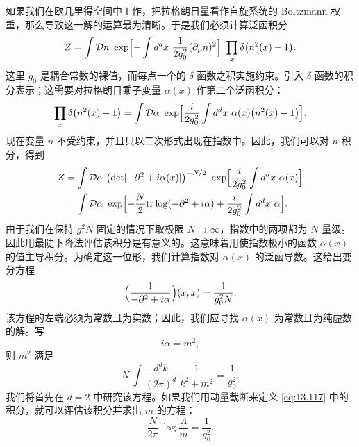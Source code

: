 如果我们在欧几里得空间中工作，把拉格朗日量看作自旋系统的 Boltzmann 权重，那么导致这一解的运算最为清晰。于是我们必须计算泛函积分
\begin{equation}
  Z = \int \mathcal{D}n\ \exp\Bigl[ -\int d^dx\ \frac{1}{2g_0^2}
    (\partial_\mu n)^2 \Bigr]\ \prod_x \delta\bigl( n^2(x) - 1 \bigr) .
  \label{eq:13.112}
\end{equation}
这里 $g_0$ 是耦合常数的裸值，而每点一个的 $\delta$ 函数之积实施约束。引入 $\delta$ 函数的积分表示；这需要对拉格朗日乘子变量 $\alpha(x)$ 作第二个泛函积分：
\begin{equation}
  \prod_x \delta\bigl( n^2(x) - 1 \bigr)
  = \int \mathcal{D}\alpha\ \exp\Bigl[ \frac{i}{2g_0^2}\int d^dx\
    \alpha(x)\bigl( n^2(x) - 1 \bigr) \Bigr] .
  \label{eq:13.113}
\end{equation}
现在变量 $n$ 不受约束，并且只以二次形式出现在指数中。因此，我们可以对 $n$ 积分，得到
\begin{equation}
  \begin{aligned}
    Z &= \int \mathcal{D}\alpha\ \bigl( \det[-\partial^2 + i\alpha(x)]
      \bigr)^{-N/2}\ \exp\Bigl[ \frac{i}{2g_0^2}\int d^dx\ \alpha(x) \Bigr]\\
    &= \int \mathcal{D}\alpha\ \exp\Bigl[ -\frac{N}{2}\mathrm{tr}\log
      (-\partial^2 + i\alpha) + \frac{i}{2g_0^2}\int d^dx\ \alpha \Bigr] .
  \end{aligned}
  \label{eq:13.114}
\end{equation}
由于我们在保持 $g^2N$ 固定的情况下取极限 $N\to\infty$，指数中的两项都为 $N$ 量级。因此用最陡下降法评估该积分是有意义的。这意味着用使指数极小的函数 $\alpha(x)$ 的值主导积分。为确定这一位形，我们计算指数对 $\alpha(x)$ 的泛函导数。这给出变分方程
\begin{equation}
  \Bigl( \frac{1}{-\partial^2 + i\alpha} \Bigr)(x,x) = \frac{1}{g_0^2N} .
  \label{eq:13.115}
\end{equation}
该方程的左端必须为常数且为实数；因此，我们应寻找 $\alpha(x)$ 为常数且为纯虚数的解。写
\begin{equation}
  i\alpha = m^2 ,
  \label{eq:13.116}
\end{equation}
则 $m^2$ 满足
\begin{equation}
  N\ \int \frac{d^dk}{(2\pi)^d}\ \frac{1}{k^2 + m^2}
  = \frac{1}{g_0^2} .
  \label{eq:13.117}
\end{equation}
我们将首先在 $d = 2$ 中研究该方程。如果我们用动量截断来定义 \eqref{eq:13.117} 中的积分，就可以评估该积分并求出 $m$ 的方程：
\begin{equation}
  \frac{N}{2\pi}\ \log\frac{\Lambda}{m} = \frac{1}{g_0^2} .
  \label{eq:13.118}
\end{equation}
